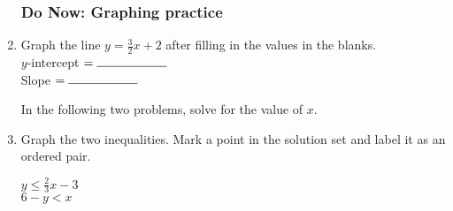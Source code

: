 \documentclass[12pt, oneside]{article}
\begin{document}
  \begin{enumerate}
    \subsubsection*{Do Now: Graphing practice}

        \item Graph the line $y=\frac{3}{2} x +2$ after filling in the values in the blanks.\\[0.85cm]
              $y$-intercept $= \rule{2cm}{0.15mm}$ \\[0.5cm]
              Slope $= \rule{2cm}{0.15mm}$\\

        \begin{center} %
        \end{center}

        In the following two problems, solve for the value of $x$.

\newpage
\item Graph the two inequalities. Mark a point in the solution set and label it as an ordered pair.

  \begin{multicols}{2}
    $y \leq \frac{2}{3} x -3$ \\
    $6-y < x$
  \end{multicols} \vspace{2cm}
  \begin{center} %
  \end{center}


\end{enumerate}
\end{document}
